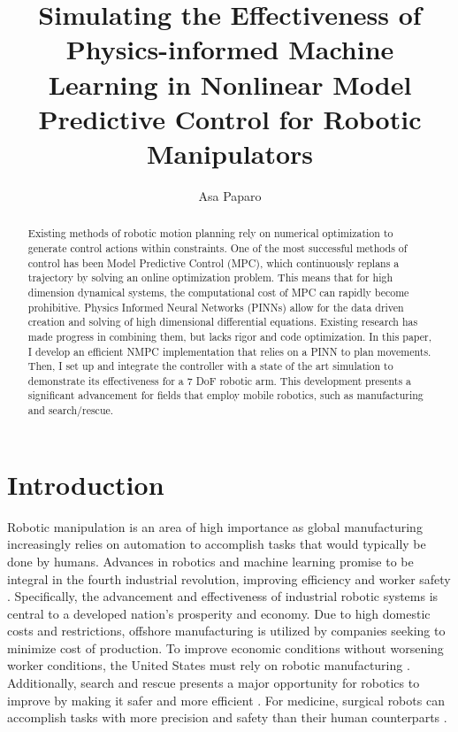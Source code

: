 \documentclass[11pt, titlepage]{article}
\title{Simulating the Effectiveness of Physics-informed Machine Learning in Nonlinear Model Predictive Control for Robotic Manipulators}
\author{Asa Paparo}
\date{}
\begin{document}
\maketitle

\begin{abstract}

Existing methods of robotic motion planning rely on numerical optimization to generate control actions within constraints. One of the most successful methods of control has been Model Predictive Control (MPC), which continuously replans a trajectory by solving an online optimization problem. This means that for high dimension dynamical systems, the computational cost of MPC can rapidly become prohibitive. Physics Informed Neural Networks (PINNs) allow for the data driven creation and solving of high dimensional differential equations. Existing research has made progress in combining them, but lacks rigor and code optimization. In this paper, I develop an efficient NMPC implementation that relies on a PINN to plan movements. Then, I set up and integrate the controller with a state of the art simulation to demonstrate its effectiveness for a 7 DoF robotic arm. This development presents a significant advancement for fields that employ mobile robotics, such as manufacturing and search/rescue.
\end{abstract}

\section{Introduction}

Robotic manipulation is an area of high importance as global manufacturing increasingly relies on automation to accomplish tasks that would typically be done by humans. Advances in robotics and machine learning promise to be integral in the fourth industrial revolution, improving efficiency and worker safety \cite{industry_4.0}. Specifically, the advancement and effectiveness of industrial robotic systems is central to a developed nation's prosperity and economy. Due to high domestic costs and restrictions, offshore manufacturing is utilized by companies seeking to minimize cost of production. To improve economic conditions without worsening worker conditions, the United States must rely on robotic manufacturing \cite{manufacturing_prosperity}. Additionally, search and rescue presents a major opportunity for robotics to improve by making it safer and more efficient \cite{search_rescue}. For medicine, surgical robots can accomplish tasks with more precision and safety than their human counterparts \cite{surgical_robots}.
\end{document}

